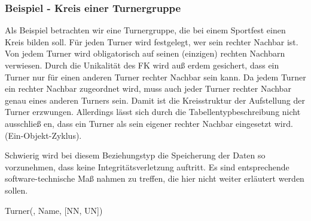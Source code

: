 \begin{center}
\end{center}


\subsubsection{Beispiel - Kreis einer Turnergruppe}
Als Beispiel betrachten wir eine Turnergruppe, die bei einem Sportfest einen Kreis bilden soll. Für jeden Turner wird festgelegt, wer sein rechter Nachbar ist.
\clearpage
Von jedem Turner wird obligatorisch auf seinen (einzigen) rechten Nachbarn verwiesen. Durch die Unikalität des FK wird auß erdem gesichert, dass ein Turner nur für einen anderen Turner rechter Nachbar sein kann. Da jedem Turner ein rechter Nachbar zugeordnet wird, muss auch jeder Turner rechter Nachbar genau eines anderen Turners sein. Damit ist die Kreisstruktur der Aufstellung der Turner erzwungen. Allerdings lässt sich durch die Tabellentypbeschreibung nicht ausschließ en, dass ein Turner als sein eigener rechter Nachbar eingesetzt wird. (Ein-Objekt-Zyklus).

Schwierig wird bei diesem Beziehungstyp die Speicherung der Daten so vorzunehmen, dass keine Integritätsverletzung auftritt. Es sind entsprechende software-technische Maß nahmen zu treffen, die hier nicht weiter erläutert werden sollen.
\begin{center}
\end{center}
\begin{small}
    Turner(, Name,  [NN, UN])
\end{small}
